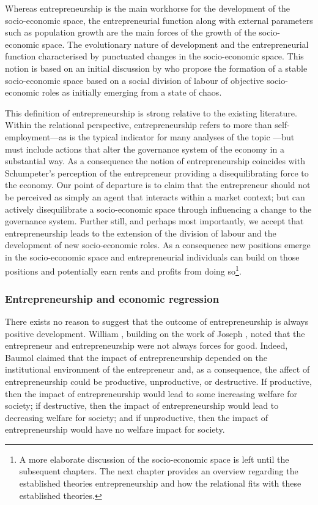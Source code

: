 Whereas entrepreneurship is the main workhorse for the development of the socio-economic space, the entrepreneurial function along with external parameters such as population growth are the main forces of the growth of the socio-economic space. The evolutionary nature of development and the entrepreneurial function characterised by punctuated changes in the socio-economic space. This notion is based on an initial discussion by \citet{GillesLazarovaRuys2006} who propose the formation of a stable socio-economic space based on a social division of labour of objective socio-economic roles as initially emerging from a state of chaos.

This definition of entrepreneurship is strong relative to the existing literature. Within the relational perspective, entrepreneurship refers to more than self-employment---as is the typical indicator for many analyses of the topic \citep{EvansJovanovic1989, Lazear2004, CagettiNardi2009, SanandajiLeeson2013}---but must include actions that alter the governance system of the economy in a substantial way. As a consequence the notion of entrepreneurship coincides with Schumpeter's perception of the entrepreneur providing a disequilibrating force to the economy. Our point of departure is to claim that the entrepreneur should not be perceived as simply an agent that interacts within a market context; but can actively disequilibrate a socio-economic space through influencing a change to the governance system. Further still, and perhaps most importantly, we accept that entrepreneurship leads to the extension of the division of labour and the development of new socio-economic roles. As a consequence new positions emerge in the socio-economic space and entrepreneurial individuals can build on those positions and potentially earn rents and profits from doing so\footnote{A more elaborate discussion of the socio-economic space is left until the subsequent chapters. The next chapter provides an overview regarding the established theories entrepreneurship and how the relational fits with these established theories.}.

\subsubsection{Entrepreneurship and economic regression}

There exists no reason to suggest that the outcome of entrepreneurship is always positive development. William \citet{Baumol1990}, building on the work of Joseph \citet{Schumpeter1942}, noted that the entrepreneur and entrepreneurship were not always forces for good. Indeed, Baumol claimed that the impact of entrepreneurship depended on the institutional environment of the entrepreneur and, as a consequence, the affect of entrepreneurship could be productive, unproductive, or destructive. If productive, then the impact of entrepreneurship would lead to some increasing welfare for society; if destructive, then the impact of entrepreneurship would lead to decreasing welfare for society; and if unproductive, then the impact of entrepreneurship would have no welfare impact for society.

